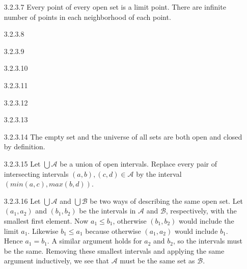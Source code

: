 \begin{enumerate}
\item[]
\item[3.2.3.7]
  Every point of every open set is a limit point. 
  There are infinite number of points in each neighborhood of each point.
\item[]
\item[3.2.3.8]
\item[]
\item[3.2.3.9]
\item[]
\item[3.2.3.10]
\item[]
\item[3.2.3.11]
\item[]
\item[3.2.3.12]
\item[]
\item[3.2.3.13]
\item[]
\item[3.2.3.14]
  The empty set and the universe of all sets are both open and closed 
  by definition.
\item[]
\item[3.2.3.15]
  Let $\bigcup \mathcal{A}$ be a union of open intervals. 
  Replace every pair of intersecting intervals $(a, b), (c, d) \in \mathcal{A}$
  by the interval $(min(a, c), max(b, d))$. 
\item[]
\item[3.2.3.16]
  Let $\bigcup \mathcal{A}$ and $\bigcup \mathcal{B}$ be two ways of
  describing the same open set. Let $(a_1, a_2)$ and $(b_1, b_2)$
  be the intervals in 
  $\mathcal{A}$ and $\mathcal{B}$, respectively,
  with the smallest first element. 
  Now $a_1 \le b_1$, otherwise $(b_1, b_2)$ would include the limit $a_1$.
  Likewise $b_1 \le a_1$ because 
  otherwise $(a_1, a_2)$ would include $b_1$. Hence $a_1 = b_1$. 
  A similar argument holds for $a_2$ and $b_2$, so the intervals 
  must be the same. Removing these smallest intervals and applying the
  same argument inductively, we see that $\mathcal{A}$ must be the 
  same set as $\mathcal{B}$.
\item[]
\end{enumerate}
